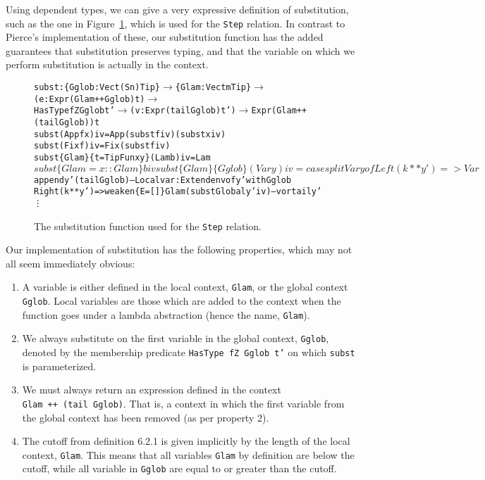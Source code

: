 Using dependent types, we can give a very expressive definition of substitution, such as the one in Figure~\ref{fig:subst}, which is used for the \texttt{Step} relation. In contrast to Pierce's implementation of these, our substitution function has the added guarantees that substitution preserves typing, and that the variable on which we perform substitution is actually in the context.  

\begin{figure}
\begin{alltt}
subst : \{Gglob : Vect (S n) Tip\} \(\rightarrow\) \{Glam: Vect m Tip\} \(\rightarrow\) (e: Expr (Glam ++ Gglob) t)\(\rightarrow\) 
        HasType fZ Gglob t' \(\rightarrow\) (v: Expr (tail Gglob) t') \(\rightarrow\) Expr (Glam ++ (tail Gglob)) t
subst                     (App f x) i v = App (subst f i v) (subst x i v)
subst                       (Fix f) i v = Fix (subst f i v)
subst \{Glam\} \{t=TipFun x y\} (Lam b) i v = Lam $ subst \{Glam = x :: Glam\} b i v
subst \{Glam\} \{Gglob\}        (Var y) i v = 
  case splitVar y of
   Left  (k ** y') => Var $ append y' (tail Gglob) -- Local var: Extend env of y' with Gglob
   Right (k ** y') => weaken \{E=[]\} Glam (substGlobal y' i v) -- v or tail y'
\vdots
\end{alltt}
\caption{The substitution function used for the \texttt{Step} relation.}
\label{fig:subst}
\end{figure}

Our implementation of substitution has the following properties, which may not all seem immediately obvious:
\begin{enumerate}
\item A variable is either defined in the local context, \texttt{Glam}, or the global context \texttt{Gglob}. Local variables are those which are added to the context when the function goes under a lambda abstraction (hence the name, \texttt{Glam}).
\item We always substitute on the first variable in the global context, \texttt{Gglob}, denoted by the membership predicate \texttt{HasType fZ Gglob t'} on which \texttt{subst} is parameterized.
\item We must always return an expression defined in the context \texttt{Glam~++~(tail~Gglob)}. That is, a context in which the first variable from the global context has been removed (as per property 2).
\item The cutoff from definition 6.2.1 is given implicitly by the length of the local context, \texttt{Glam}. This means that all variables \texttt{Glam} by definition are below the cutoff, while all variable in \texttt{Gglob} are equal to or greater than the cutoff.
\end{enumerate}

